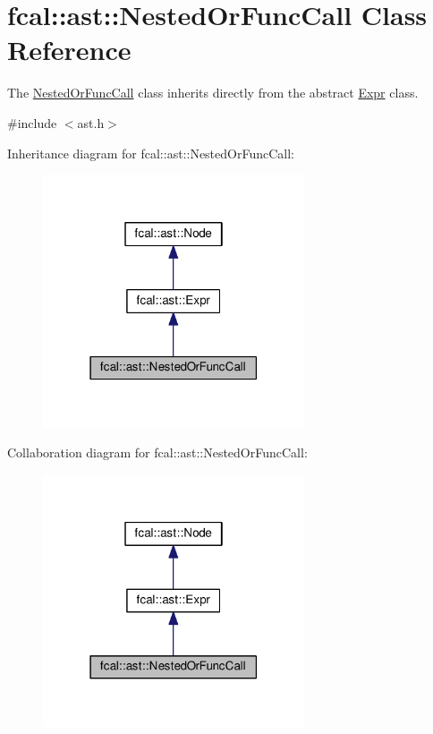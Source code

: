 \hypertarget{classfcal_1_1ast_1_1NestedOrFuncCall}{}\section{fcal\+:\+:ast\+:\+:Nested\+Or\+Func\+Call Class Reference}
\label{classfcal_1_1ast_1_1NestedOrFuncCall}


The \hyperlink{classfcal_1_1ast_1_1NestedOrFuncCall}{Nested\+Or\+Func\+Call} class inherits directly from the abstract \hyperlink{classfcal_1_1ast_1_1Expr}{Expr} class.  




{\ttfamily \#include $<$ast.\+h$>$}



Inheritance diagram for fcal\+:\+:ast\+:\+:Nested\+Or\+Func\+Call\+:\nopagebreak
\begin{figure}[H]
\begin{center}
\leavevmode
\includegraphics[width=219pt]{classfcal_1_1ast_1_1NestedOrFuncCall__inherit__graph}
\end{center}
\end{figure}


Collaboration diagram for fcal\+:\+:ast\+:\+:Nested\+Or\+Func\+Call\+:\nopagebreak
\begin{figure}[H]
\begin{center}
\leavevmode
\includegraphics[width=219pt]{classfcal_1_1ast_1_1NestedOrFuncCall__coll__graph}
\end{center}
\end{figure}
